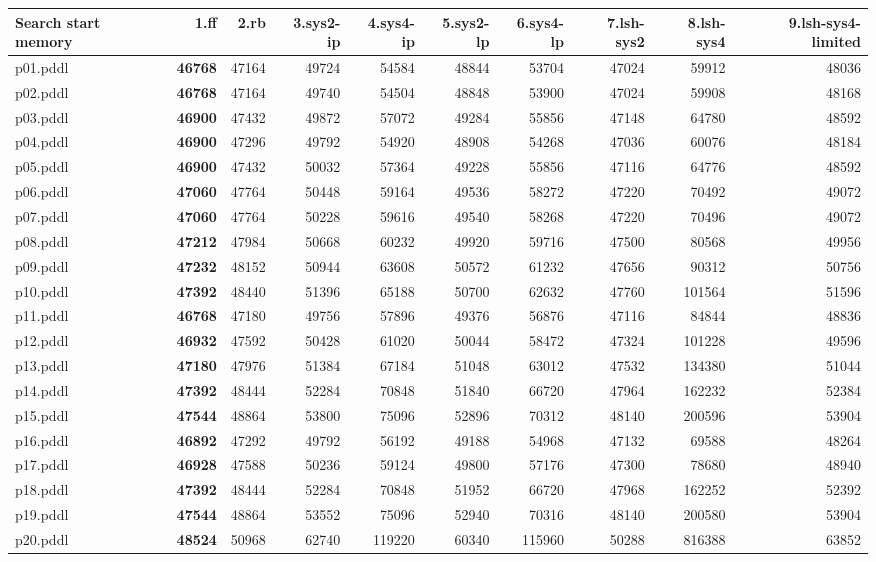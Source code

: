 \documentclass{article}
\begin{document}
\begin{tabular}{@{}lrrrrrrrrr@{}}
Search start memory & 1.ff & 2.rb & 3.sys2-ip & 4.sys4-ip & 5.sys2-lp & 6.sys4-lp & 7.lsh-sys2 & 8.lsh-sys4 & 9.lsh-sys4-limited \\
\midrule
p01.pddl & \textbf{46768} & 47164 & 49724 & 54584 & 48844 & 53704 & 47024 & 59912 & 48036 \\
p02.pddl & \textbf{46768} & 47164 & 49740 & 54504 & 48848 & 53900 & 47024 & 59908 & 48168 \\
p03.pddl & \textbf{46900} & 47432 & 49872 & 57072 & 49284 & 55856 & 47148 & 64780 & 48592 \\
p04.pddl & \textbf{46900} & 47296 & 49792 & 54920 & 48908 & 54268 & 47036 & 60076 & 48184 \\
p05.pddl & \textbf{46900} & 47432 & 50032 & 57364 & 49228 & 55856 & 47116 & 64776 & 48592 \\
p06.pddl & \textbf{47060} & 47764 & 50448 & 59164 & 49536 & 58272 & 47220 & 70492 & 49072 \\
p07.pddl & \textbf{47060} & 47764 & 50228 & 59616 & 49540 & 58268 & 47220 & 70496 & 49072 \\
p08.pddl & \textbf{47212} & 47984 & 50668 & 60232 & 49920 & 59716 & 47500 & 80568 & 49956 \\
p09.pddl & \textbf{47232} & 48152 & 50944 & 63608 & 50572 & 61232 & 47656 & 90312 & 50756 \\
p10.pddl & \textbf{47392} & 48440 & 51396 & 65188 & 50700 & 62632 & 47760 & 101564 & 51596 \\
p11.pddl & \textbf{46768} & 47180 & 49756 & 57896 & 49376 & 56876 & 47116 & 84844 & 48836 \\
p12.pddl & \textbf{46932} & 47592 & 50428 & 61020 & 50044 & 58472 & 47324 & 101228 & 49596 \\
p13.pddl & \textbf{47180} & 47976 & 51384 & 67184 & 51048 & 63012 & 47532 & 134380 & 51044 \\
p14.pddl & \textbf{47392} & 48444 & 52284 & 70848 & 51840 & 66720 & 47964 & 162232 & 52384 \\
p15.pddl & \textbf{47544} & 48864 & 53800 & 75096 & 52896 & 70312 & 48140 & 200596 & 53904 \\
p16.pddl & \textbf{46892} & 47292 & 49792 & 56192 & 49188 & 54968 & 47132 & 69588 & 48264 \\
p17.pddl & \textbf{46928} & 47588 & 50236 & 59124 & 49800 & 57176 & 47300 & 78680 & 48940 \\
p18.pddl & \textbf{47392} & 48444 & 52284 & 70848 & 51952 & 66720 & 47968 & 162252 & 52392 \\
p19.pddl & \textbf{47544} & 48864 & 53552 & 75096 & 52940 & 70316 & 48140 & 200580 & 53904 \\
p20.pddl & \textbf{48524} & 50968 & 62740 & 119220 & 60340 & 115960 & 50288 & 816388 & 63852 \\
\end{tabular}
\end{document}
